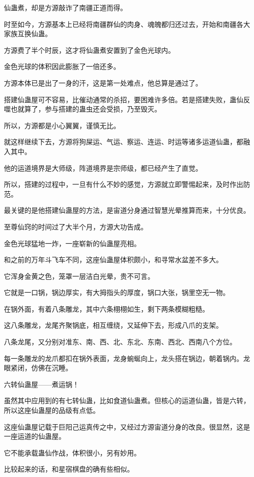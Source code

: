 \begin{this_body}
仙蛊煮，却是方源敲诈了南疆正道而得。

时至如今，方源基本上已经将南疆群仙的肉身、魂魄都归还过去，开始和南疆各大家族互换仙蛊。

方源费了半个时辰，这才将仙蛊煮安置到了金色光球内。

金色光球的体积因此膨胀了一倍还多。

方源本体已是出了一身的汗，这是第一处难点，他总算是通过了。

搭建仙蛊屋可不容易，比催动通常的杀招，要困难许多倍。若是搭建失败，蛊仙反噬也就算了，参与搭建的蛊虫还会受损，乃至毁灭。

所以，方源都是小心翼翼，谨慎无比。

就这样继续下去，方源将狗屎运、气运、察运、连运、时运等诸多运道仙蛊，都融入其中。

他的运道境界是大师级，阵道境界是宗师级，都已经产生了直觉。

所以，搭建的过程中，一旦有什么不妙的感觉，方源就立即警惕起来，及时作出防范。

最关键的是他搭建仙蛊屋的方法，是宙道分身通过智慧光晕推算而来，十分优良。

至尊仙窍的时间过了大半个月，方源大功告成。

金色光球猛地一炸，一座崭新的仙蛊屋亮相。

和之前的万年斗飞车不同，这座仙蛊屋体积颇小，和寻常水盆差不多大。

它浑身金黄之色，笼罩一层洁白光晕，贵不可言。

它就是一口锅，锅边厚实，有大拇指头的厚度，锅口大张，锅里空无一物。

在锅外面，有着八条雕龙，其中六条栩栩如生，剩下两条模糊粗糙。

这八条雕龙，龙尾齐聚锅底，相互缠绕，又延伸下去，形成八爪的支架。

八条龙尾，又分别对准东、南、西、北、东北、东南、西北、西南八个方位。

每一条雕龙的龙爪都扣在锅外表面，龙身蜿蜒向上，龙头搭在锅边，朝着锅内。龙眼紧闭，仿佛在沉睡。

六转仙蛊屋——煮运锅！

虽然其中应用到的有七转仙蛊，比如食道仙蛊煮。但核心的运道仙蛊，皆是六转，所以这座仙蛊屋的品级有点低。

这座仙蛊屋记载于巨阳己运真传之中，又经过方源宙道分身的改良。很显然，这是一座运道的仙蛊屋。

它不能承载蛊仙作战，体积很小，另有妙用。

比较起来的话，和星宿棋盘的确有些相似。


\end{this_body}
